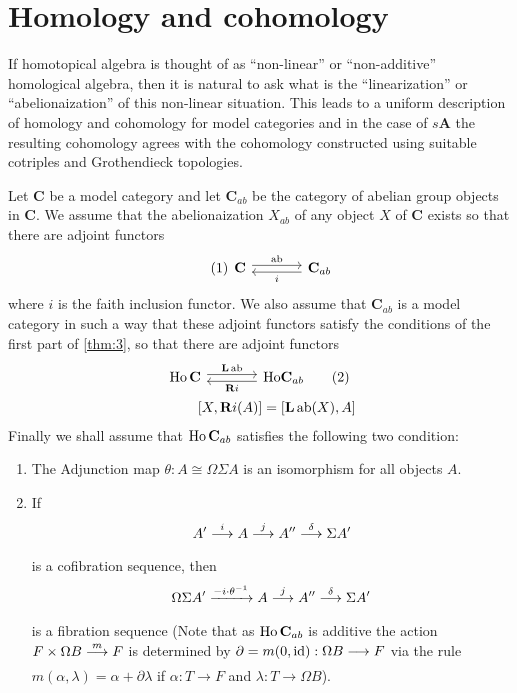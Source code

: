 \documentclass[../main]{subfiles}
\begin{document}
\section{Homology and cohomology}\label{sec:2.5}

If homotopical algebra is thought of as ``non-linear'' or ``non-additive'' homological algebra, then it is natural to ask what is the ``linearization'' or ``abelionaization'' of this non-linear situation. This leads to a uniform description of homology and cohomology for model categories and in the case of $s \mathbf A$ the resulting cohomology agrees with the cohomology constructed using suitable cotriples and Grothendieck topologies.


Let $\mathbf C$ be a model category and let $\mathbf C_{ab}$ be the category of abelian group objects in $\mathbf C$. We assume that the abelionaization $X_{ab}$ of any object $X$ of $\mathbf C$ exists so that there are adjoint functors
\begin{equation}\tag{1}\label{eqn:2.4.1}
  \begin{tikzcd}[column sep=large] 
    \mathbf C \rar["\ab", shift left] & \lar["i", shift left] \mathbf C_{ab} 
  \end{tikzcd}
\end{equation}
where $i$ is the faith inclusion functor. We also assume that $\mathbf C_{ab}$ is a model category in such a way that these adjoint functors satisfy the conditions of the first part of \ref{thm:3}, so that there are adjoint functors 
\begin{align} 
  \begin{tikzcd}[column sep=large, ampersand replacement=\&] \label{eqn:2.4.2}
   \Ho \mathbf C \rar["\mathbf L \ab", shift left] \& \lar["\mathbf R i", shift left] \mathbf \Ho  \mathbf C_{ab} \tag{2}
  \end{tikzcd} \\
[X, \mathbf Ri(A)] = [\mathbf L \ab(X), A]  \notag
\end{align}
Finally we shall assume that $\operatorname{Ho} \mathbf C_{ab}$ satisfies the following two condition:

\begin{enumerate} 
  \item [A.] The Adjunction map $\theta\colon A  \cong \Omega \Sigma A $ is an isomorphism for all objects $A$.
  
  \item [B.] If \[A' \varrightarrow{i} A \varrightarrow{j} A'' \varrightarrow{\delta} \Sigma A'\] is a cofibration sequence, then
  \[\Omega\Sigma A' \varrightarrow{-i \cdot \theta^{-1}} A \varrightarrow{j} A'' \varrightarrow{\delta} \Sigma A'\]
  is a fibration sequence (Note that as $\operatorname{Ho} \mathbf C_{ab}$ is additive the action\\ $F\times \Omega B \varrightarrow{m}F$ is determined by $\partial = m(0, \operatorname{id} ): \Omega B \longrightarrow F$ via the rule \\$m(\alpha, \lambda) = \alpha + \partial\lambda$ if $\alpha: T \longrightarrow F$ and $\lambda:T \longrightarrow \Omega B$).
\end{enumerate}
\end{document}
